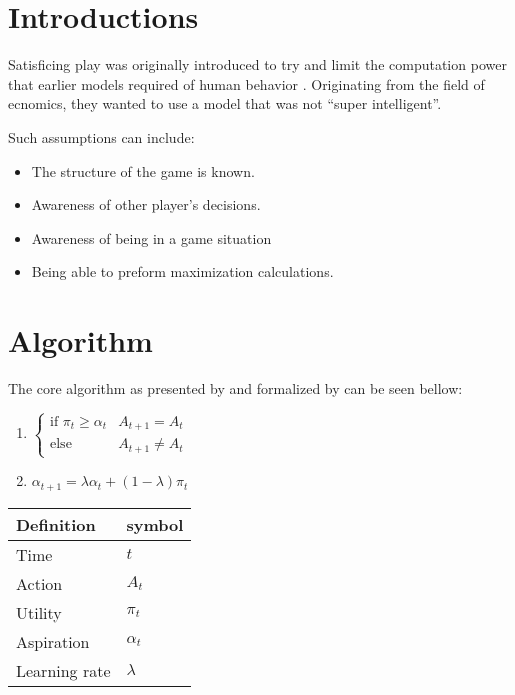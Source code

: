\abstract{
}



\section{Introductions}

Satisficing play was originally introduced
to try and limit the computation power that earlier models required of human
behavior \citep{herbert}. Originating from the field of ecnomics, they
wanted to use a model that was not ``super intelligent''.

Such assumptions can include:

\begin{itemize}
  \item The structure of the game is known.
  \item Awareness of other player's decisions.
  \item Awareness of being in a game situation
  \item Being able to preform maximization calculations.
\end{itemize}

\section{Algorithm}
The core algorithm as presented by \citep{herbert} and formalized by
\citep{karandikar}
can be seen bellow:

\begin{enumerate}
  \item $ \begin{cases}
              \text{if } \pi_t \geq \alpha_t & A_{t+1} = A_t\\
              \text{else} & A_{t+1} \neq A_t
              \end{cases}$
  \item $ \alpha_{t+1} = \lambda \alpha_t + (1-\lambda) \pi_t $ \\
\end{enumerate}
\begin{tabular}{ll}
  Definition & symbol \\ \toprule
  Time & $t$ \\
  Action & $A_t$ \\
  Utility & $\pi_t$ \\
  Aspiration & $\alpha_t$ \\
  Learning rate & $\lambda$ \\ \bottomrule
\end{tabular}

